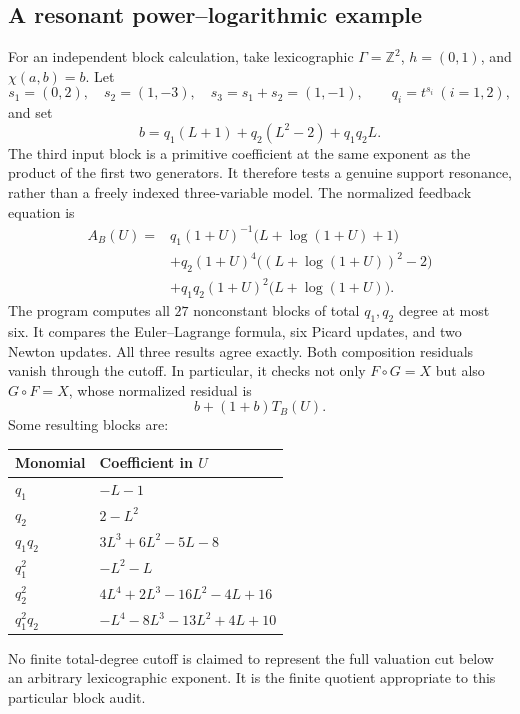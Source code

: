\documentclass[11pt,a4paper]{article}
\theoremstyle{definition}
\theoremstyle{remark}
\newcommand{\Z}{\mathbb Z}
\begin{document}
\subsection{A resonant power--logarithmic example}
For an independent block calculation, take lexicographic $\Gamma=\Z^2$,
$h=(0,1)$, and $\chi(a,b)=b$. Let
\[
 s_1=(0,2),\quad s_2=(1,-3),\quad s_3=s_1+s_2=(1,-1),
 \qquad q_i=t^{s_i}\ (i=1,2),
\]
and set
\begin{equation}\label{eq:verifiedb}
 b=q_1(L+1)+q_2(L^2-2)+q_1q_2L.
\end{equation}
The third input block is a primitive coefficient at the same exponent as
the product of the first two generators. It therefore tests a genuine
support resonance, rather than a freely indexed three-variable model.
The normalized feedback equation is
\begin{align*}
 A_B(U)={}&q_1(1+U)^{-1}\bigl(L+\log(1+U)+1\bigr)\\
 &+q_2(1+U)^4\bigl((L+\log(1+U))^2-2\bigr)\\
 &+q_1q_2(1+U)^2\bigl(L+\log(1+U)\bigr).
\end{align*}
The program computes all $27$ nonconstant blocks of total $q_1,q_2$
degree at most six. It compares the Euler--Lagrange formula, six Picard
updates, and two Newton updates. All three results agree exactly. Both
composition residuals vanish through the cutoff. In particular, it checks
not only $F\circ G=X$ but also $G\circ F=X$, whose normalized residual is
\[
 b+(1+b)T_B(U).
\]
Some resulting blocks are:
\begin{center}
\begin{tabular}{@{}lp{}@{}}
\toprule
Monomial & Coefficient in $U$\\
\midrule
$q_1$ & $-L-1$\\[0.2em]
$q_2$ & $2-L^2$\\[0.2em]
$q_1q_2$ & $3L^3+6L^2-5L-8$\\[0.2em]
$q_1^2$ & $-L^2-L$\\[0.2em]
$q_2^2$ & $4L^4+2L^3-16L^2-4L+16$\\[0.2em]
$q_1^2q_2$ & $-L^4-8L^3-13L^2+4L+10$\\
\bottomrule
\end{tabular}
\end{center}
No finite total-degree cutoff is claimed to represent the full valuation
cut below an arbitrary lexicographic exponent. It is the finite quotient
appropriate to this particular block audit.
\end{document}
